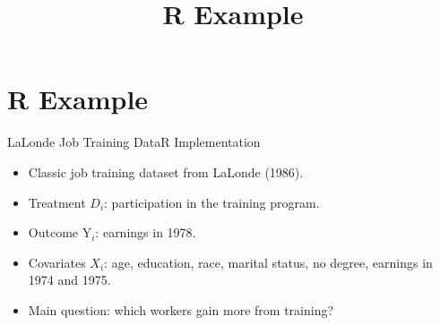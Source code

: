 \documentclass[hyperref={pdfpagelabels=false}]{beamer}
\newcommand{\indep}{\perp\!\!\!\perp}
\begin{document}




\title[]
{R Example}

\subtitle{}
\author{}
\institute{}
\date{}

\begin{frame}{}
  \titlepage
\end{frame}

\section{R Example}

\begin{frame}{LaLonde Job Training Data}{R Implementation}
\begin{itemize}
  \item Classic job training dataset from LaLonde (1986).
  \vspace{0.2cm}
  \item Treatment $D_i$: participation in the training program.
  \vspace{0.2cm}
  \item Outcome $\mathrm{Y}_i$: earnings in 1978.
  \vspace{0.2cm}
  \item Covariates $X_i$: age, education, race, marital status, no degree, earnings in 1974 and 1975.
  \vspace{0.2cm}
  \item Main question: which workers gain more from training?
\end{itemize}
\end{frame}
\end{document}
